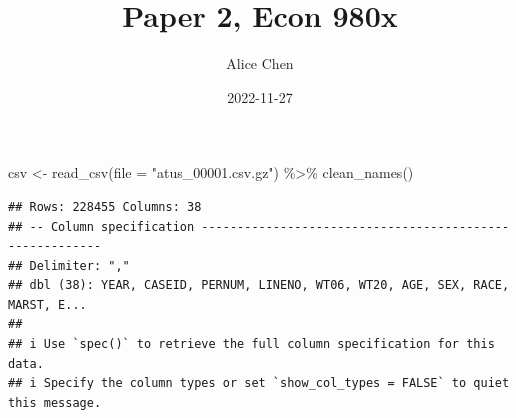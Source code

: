 \documentclass[
]{article}
\title{Paper 2, Econ 980x}
\author{Alice Chen}
\date{2022-11-27}
\newenvironment{Shaded}{\begin{snugshade}}{\end{snugshade}}
\newcommand{\AttributeTok}[1]{\textcolor[rgb]{0.77,0.63,0.00}{#1}}
\newcommand{\FunctionTok}[1]{\textcolor[rgb]{0.00,0.00,0.00}{#1}}
\newcommand{\NormalTok}[1]{#1}
\newcommand{\OtherTok}[1]{\textcolor[rgb]{0.56,0.35,0.01}{#1}}
\newcommand{\SpecialCharTok}[1]{\textcolor[rgb]{0.00,0.00,0.00}{#1}}
\newcommand{\StringTok}[1]{\textcolor[rgb]{0.31,0.60,0.02}{#1}}
\begin{document}
\maketitle

\begin{Shaded}
\begin{Highlighting}[]
\NormalTok{csv }\OtherTok{\textless{}{-}} \FunctionTok{read\_csv}\NormalTok{(}\AttributeTok{file =} \StringTok{"atus\_00001.csv.gz"}\NormalTok{) }\SpecialCharTok{\%\textgreater{}\%}
  \FunctionTok{clean\_names}\NormalTok{()}
\end{Highlighting}
\end{Shaded}

\begin{verbatim}
## Rows: 228455 Columns: 38
## -- Column specification --------------------------------------------------------
## Delimiter: ","
## dbl (38): YEAR, CASEID, PERNUM, LINENO, WT06, WT20, AGE, SEX, RACE, MARST, E...
## 
## i Use `spec()` to retrieve the full column specification for this data.
## i Specify the column types or set `show_col_types = FALSE` to quiet this message.
\end{verbatim}
\end{document}
